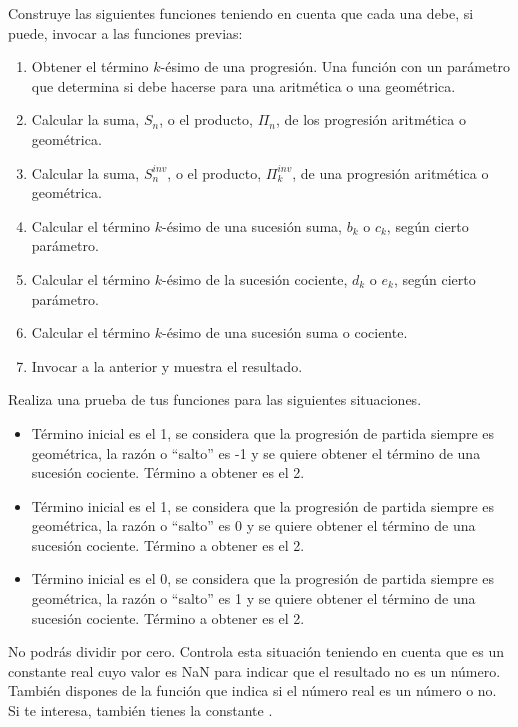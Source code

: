 Construye las siguientes funciones teniendo en cuenta que cada una debe, si puede, invocar a las funciones previas:

\begin{enumerate}
\item Obtener el término $k$-ésimo de una progresión. Una función con un parámetro que determina si debe hacerse para una aritmética o una geométrica.
\item Calcular la suma, $S_n$, o el producto, $\Pi_n$, de los  progresión aritmética o geométrica. 
\item Calcular la suma, $S^{inv}_n$, o el producto, $\Pi_k^{inv}$, de una progresión aritmética o geométrica.
\item Calcular el término $k$-ésimo de una sucesión suma, $b_k$ o $c_k$, según cierto parámetro.
\item Calcular el término $k$-ésimo de la sucesión cociente,  $d_k$ o $e_k$, según cierto parámetro.
\item Calcular el término $k$-ésimo de una sucesión suma o cociente.
\item Invocar a la anterior y muestra el resultado.
\end{enumerate}

Realiza  una prueba de tus funciones para las siguientes situaciones.
\begin{itemize}
\item Término inicial es el 1, se considera que la progresión de partida siempre es geométrica, la razón o ``salto'' es -1 y se quiere obtener el término de una sucesión cociente. Término a obtener es el 2.
\item Término inicial es el 1, se considera que la progresión de partida siempre es geométrica, la razón o ``salto'' es 0 y se quiere obtener el término de una sucesión cociente. Término a obtener es el 2.
\item Término inicial es el 0, se considera que la progresión de partida siempre es geométrica, la razón o ``salto'' es 1 y se quiere obtener el término de una sucesión cociente. Término a obtener es el 2.
\end{itemize}

No podrás dividir por cero. Controla esta situación teniendo en cuenta que  es un constante real cuyo valor es NaN para indicar que el resultado no es un número. También dispones de la función    que indica si el número real  es un número o no. Si te interesa, también tienes la constante  .

